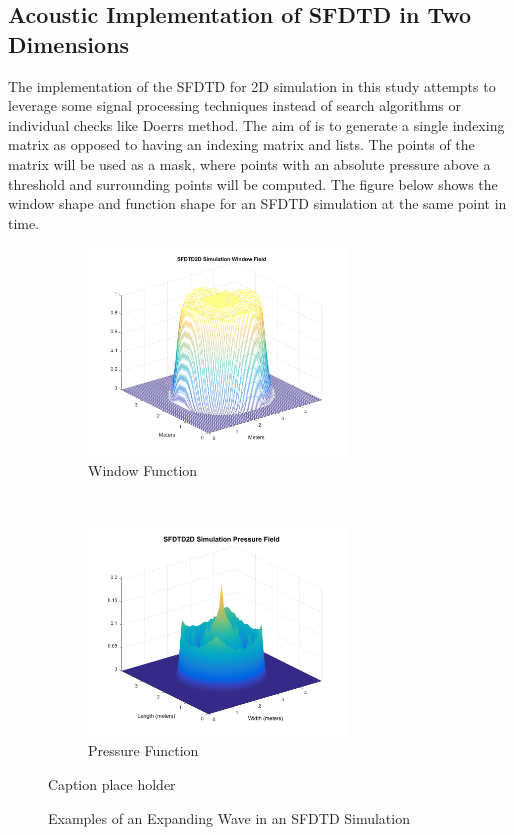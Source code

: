 \subsection{Acoustic Implementation of SFDTD in Two Dimensions}
The implementation of the SFDTD for 2D simulation in this study attempts to leverage some signal processing techniques instead of search algorithms or individual checks like Doerrs method. The aim of is to generate a single indexing matrix as opposed to having an indexing matrix and lists. The points of the matrix will be used as a mask, where points with an absolute pressure above a threshold and surrounding points will be computed. The figure below shows the window shape and function shape for an SFDTD simulation at the same point in time.\\
\begin{figure}[H]
    \centering
    \begin{subfigure}[b]
        \centering
       \includegraphics[width=0.75\textwidth]{./graphics/sfdtd2dwindowexample.png}
        \caption{Window Function}
    \end{subfigure}%
    ~ 
    \begin{subfigure}[b]
        \centering
          \includegraphics[width=0.75\textwidth]{./graphics/sfdtd2dpressureexample.png}
        \caption{Pressure Function}
    \end{subfigure}
    \caption{Caption place holder}
  \caption{Examples of an Expanding Wave in an SFDTD Simulation}
\end{figure}

